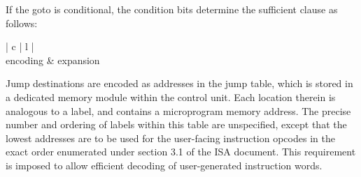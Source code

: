 \documentclass[12pt]{article}
\begin{document}
\pagebreak
If the goto is conditional, the condition bits determine the sufficient clause as follows:

\begin{longtable}{| c | l |}
\hline
{} \\
\hline
encoding & expansion \\
\hline

\hline
\end{longtable}

Jump destinations are encoded as addresses in the jump table, which is stored in a dedicated memory module within the control unit.
Each location therein is analogous to a label, and contains a microprogram memory address.
The precise number and ordering of labels within this table are unspecified, except that the lowest addresses are to be used for the user-facing instruction opcodes in the exact order enumerated under section 3.1 of the ISA document.
This requirement is imposed to allow efficient decoding of user-generated instruction words.
\end{document}
